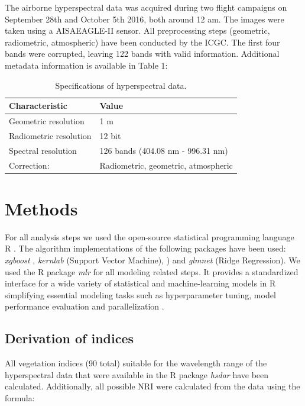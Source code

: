 \documentclass[review]{elsarticle}
\begin{document}
The airborne hyperspectral data was acquired during two flight campaigns on September 28th and October 5th 2016, both around 12 am.
The images were taken using a AISAEAGLE-II sensor.
All preprocessing steps (geometric, radiometric, atmospheric) have been conducted by the \ac{ICGC}.
The first four bands were corrupted, leaving 122 bands with valid information.
Additional metadata information is available in Table 1:

\begin{table}[b!]
\centering
\caption[t]{Specifications of hyperspectral data.}
\begingroup\footnotesize
\begin{tabular}{ll}
	\\
	Characteristic         & Value                               \\
	\hline
	Geometric resolution   & 1 m                                 \\
	Radiometric resolution & 12 bit                              \\
	Spectral resolution    & 126 bands (404.08 nm - 996.31 nm)   \\
	Correction:            & Radiometric, geometric, atmospheric
\end{tabular}
\endgroup
\label{tab:hyperparameter_limits}
\end{table}

\section{Methods}

For all analysis steps we used the open-source statistical programming language R \citep{R_core}.
The algorithm implementations of the following packages have been used: \textit{xgboost} \citep{chenXGBoostScalableTree2016}, \textit{kernlab} \citep{kernlab} (Support Vector Machine), \cite{Vapnik1998}) and \textit{glmnet} \citep{glmnet} (Ridge Regression).
We used the R package \textit{mlr} for all modeling related steps.
It provides a standardized interface for a wide variety of statistical and machine-learning models in R simplifying essential modeling tasks such as hyperparameter tuning, model performance evaluation and parallelization \citep{bischlMlrMachineLearning2016}.

\subsection{Derivation of indices}

All vegetation indices (90 total) suitable for the wavelength range of the hyperspectral data that were available in the R package \textit{hsdar} have been calculated.
Additionally, all possible \ac{NRI} were calculated from the data using the formula:
\end{document}
